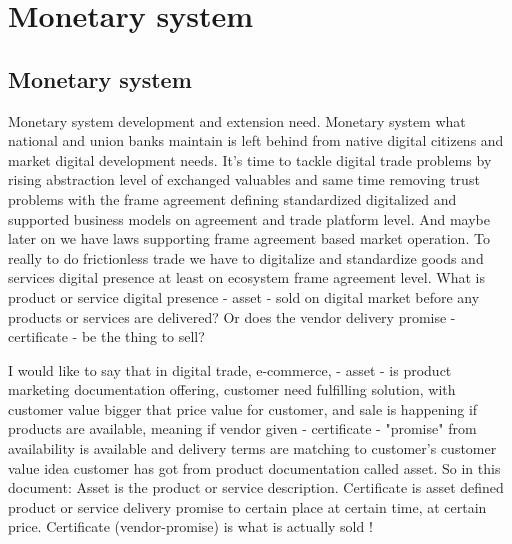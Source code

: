 %
%
%
\part{Monetary system}
\chapter{Monetary system}
\label{monetary_system}
Monetary system development and extension need. Monetary system what national and union banks maintain is left behind from native digital citizens and market digital development needs. It's time to tackle digital trade problems by rising abstraction level of exchanged valuables and same time removing trust problems with the frame agreement defining standardized digitalized and supported business models on agreement and trade platform level. And maybe later on we have laws supporting frame agreement based market operation. To really to do frictionless trade we have to digitalize and standardize goods and services digital presence at least on ecosystem frame agreement level. What is product or service digital presence - asset - sold on digital market before any products or services are delivered? Or does the vendor delivery promise - certificate - be the thing to sell?

I would like to say that in digital trade, e-commerce, - asset - is product marketing documentation offering, customer need fulfilling solution, with customer value bigger that price value for customer, and sale is happening if products are available, meaning if vendor given - certificate - "promise" from availability is available and delivery terms are matching to customer's customer value idea customer has got from product documentation called asset. So in this document: Asset is the product or service description. Certificate is asset defined product or service delivery promise to certain place at certain time, at certain price. Certificate (vendor-promise) is what is actually sold !

